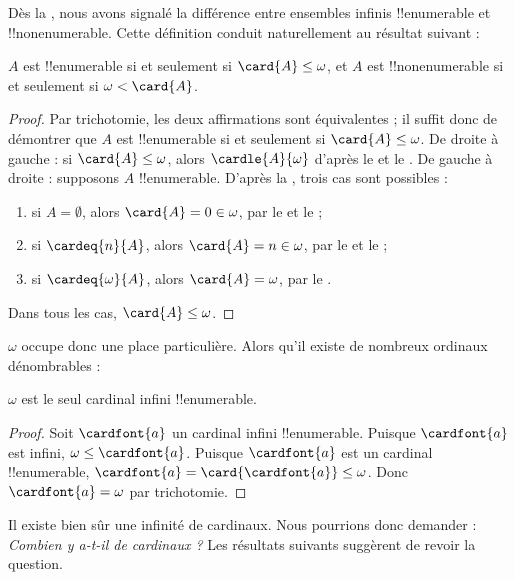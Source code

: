 \documentclass[../../../include/open-logic-section]{subfiles}
\begin{document}
Dès la ,
nous avons signalé la différence entre ensembles
infinis !!{enumerable} et !!{nonenumerable}.
Cette définition conduit naturellement au résultat
suivant :

\begin{prop}
$A$ est !!{enumerable} si et seulement si
$\card{A} \leq \omega$, et $A$ est
!!{nonenumerable} si et seulement si
$\omega < \card{A}$.
\end{prop}

\begin{proof}
Par trichotomie, les deux affirmations sont
équivalentes ; il suffit donc de démontrer que
$A$ est !!{enumerable} si et seulement si
$\card{A} \leq \omega$. De droite à gauche :
si $\card{A} \leq \omega$, alors
$\cardle{A}{\omega}$ d'après le
et le . De gauche à droite :
supposons $A$ !!{enumerable}. D'après la
,
trois cas sont possibles :
\begin{enumerate}
	\item si $A = \emptyset$, alors
	$\card{A} = 0 \in \omega$, par le
	 et le
	 ;
	\item si $\cardeq{n}{A}$, alors
	$\card{A} = n \in \omega$, par le
	 et le
	 ;
	\item si $\cardeq{\omega}{A}$, alors
	$\card{A} = \omega$, par
	le .
\end{enumerate}
Dans tous les cas, $\card{A} \leq \omega$.
\end{proof}
\noindent
$\omega$ occupe donc une place particulière.
Alors qu'il existe de nombreux ordinaux dénombrables :

\begin{cor}
$\omega$ est le seul cardinal infini !!{enumerable}.
\end{cor}

\begin{proof}
Soit $\cardfont{a}$ un cardinal infini
!!{enumerable}. Puisque $\cardfont{a}$
est infini, $\omega \leq \cardfont{a}$.
Puisque $\cardfont{a}$ est un cardinal
!!{enumerable},
$\cardfont{a} =
\card{\cardfont{a}} \leq \omega$.
Donc $\cardfont{a} = \omega$ par trichotomie.
\end{proof}

Il existe bien sûr une infinité de cardinaux.
Nous pourrions donc demander :
\emph{Combien y a-t-il de cardinaux ?}
Les résultats suivants suggèrent de revoir
la question.
\end{document}
